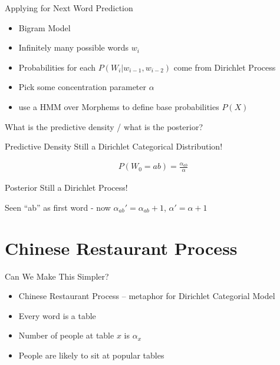 \documentclass[11pt]{beamer}
\begin{document}
	\begin{frame}{Applying for Next Word Prediction}
		\begin{itemize}
			\item Bigram Model
			\item Infinitely many possible words $w_i$
			\item Probabilities for each $P(W_i|w_{i-1},w_{i-2})$ come from Dirichlet Process
			\item Pick some concentration parameter $\alpha$
			\item use a HMM over Morphems to define base probabilities $P(X)$
		\end{itemize}
		
		\vspace{10pt} What is the predictive density / what is the posterior?
	\end{frame}
	
	\begin{frame}{Predictive Density}
		Still a Dirichlet Categorical Distribution!
		
		\begin{align*}
			P(W_{0}=ab) = \frac{\alpha_{ab}}{\alpha}
		\end{align*}
	\end{frame}
	
	\begin{frame}{Posterior}
		Still a Dirichlet Process!
		
		\vspace{10pt} Seen ``ab'' as first word - now $\alpha_{ab}' = \alpha_{ab}+1$, $\alpha' = \alpha + 1$ 
	\end{frame}
	
	\section{Chinese Restaurant Process}
	
	\begin{frame}{Can We Make This Simpler?}
		\begin{itemize}
			\item Chinese Restaurant Process -- metaphor for Dirichlet Categorial Model
			\item Every word is a table
			\item Number of people at table $x$ is $\alpha_x$
			\item People are likely to sit at popular tables
		\end{itemize}
	\end{frame}
	
\end{document}
